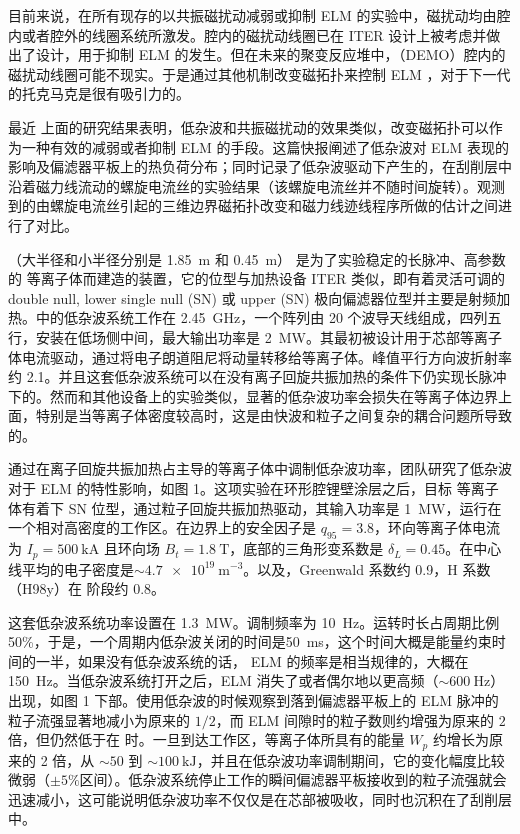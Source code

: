 目前来说，在所有现存的以共振磁扰动减弱或抑制 ELM 的实验中，磁扰动均由腔内或者腔外的线圈系统所激发。腔内的磁扰动线圈已在 ITER 设计上被考虑并做出了设计，用于抑制 ELM 的发生。但在未来的聚变反应堆中，（DEMO）腔内的磁扰动线圈可能不现实。于是通过其他机制改变磁拓扑来控制 ELM ，对于下一代的托克马克是很有吸引力的。

最近 \east 上面的研究结果表明，低杂波和共振磁扰动的效果类似，改变磁拓扑可以作为一种有效的减弱或者抑制 ELM 的手段。这篇快报阐述了低杂波对 ELM 表现的影响及偏滤器平板上的热负荷分布；同时记录了低杂波驱动下产生的，在刮削层中沿着磁力线流动的螺旋电流丝的实验结果（该螺旋电流丝并不随时间旋转）。观测到的由螺旋电流丝引起的三维边界磁拓扑改变和磁力线迹线程序所做的估计之间进行了对比。

\east （大半径和小半径分别是 \SI{1.85}{\metre} 和 \SI{0.45}{\metre}） 是为了实验稳定的长脉冲、高参数的 \Hmode 等离子体而建造的装置，它的位型与加热设备 ITER 类似，即有着灵活可调的 double null, lower single null (SN) 或 upper (SN) 极向偏滤器位型并主要是射频加热。\east 中的低杂波系统工作在 \SI{2.45}{\giga\hertz}，一个阵列由 20 个波导天线组成，四列五行，安装在低场侧中间，最大输出功率是 \SI{2}{\mega\watt}。其最初被设计用于芯部等离子体电流驱动，通过将电子朗道阻尼将动量转移给等离子体。峰值平行方向波折射率约 2.1。并且这套低杂波系统可以在没有离子回旋共振加热的条件下仍实现长脉冲下的\Hmode 。然而和其他设备上的实验类似，显著的低杂波功率会损失在等离子体边界上面，特别是当等离子体密度较高时，这是由快波和粒子之间复杂的耦合问题所导致的。

通过在离子回旋共振加热占主导的\Hmode 等离子体中调制低杂波功率，团队研究了低杂波对于 ELM 的特性影响，如图 1。这项实验在环形腔锂壁涂层之后，目标 \Hmode 等离子体有着下 SN 位型，通过粒子回旋共振加热驱动，其输入功率是 \SI{1}{\mega\watt}，运行在一个相对高密度的工作区。在边界上的安全因子是 $q_{95}=3.8$，环向等离子体电流为 $I_p=\SI{500}{\kilo\ampere}$ 且环向场 $B_t=\SI{1.8}{\tesla}$，底部的三角形变系数是 $\delta_L=0.45$。在中心线平均的电子密度是$\sim\SI{4.7e19}{\meter^{-3}}$。以及，Greenwald 系数约 0.9，H 系数（H98y）在 \Hmode 阶段约 0.8。

这套低杂波系统功率设置在 \SI{1.3}{\mega\watt}。调制频率为 \SI{10}{\hertz}。运转时长占周期比例 50\%，于是，一个周期内低杂波关闭的时间是\SI{50}{\milli\second}，这个时间大概是能量约束时间的一半，如果没有低杂波系统的话， ELM 的频率是相当规律的，大概在 \SI{150}{\hertz}。当低杂波系统打开之后，ELM 消失了或者偶尔地以更高频（$\sim\SI{600}{\hertz}$）出现，如图 1 下部。使用低杂波的时候观察到落到偏滤器平板上的 ELM 脉冲的粒子流强显著地减小为原来的 $1/2$，而 ELM 间隙时的粒子数则约增强为原来的 $2$ 倍，但仍然低于在 \Lmode 时。一旦到达\Hmode 工作区，等离子体所具有的能量 $W_p$ 约增长为原来的 2 倍，从 $\sim 50$ 到 $\sim\SI{100}{\kilo\joule}$，并且在低杂波功率调制期间，它的变化幅度比较微弱（$\pm 5\%$区间）。低杂波系统停止工作的瞬间偏滤器平板接收到的粒子流强就会迅速减小，这可能说明低杂波功率不仅仅是在芯部被吸收，同时也沉积在了刮削层中。

